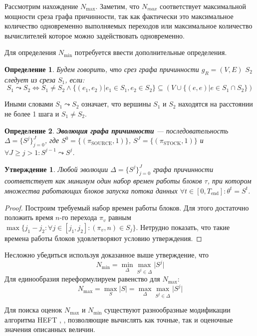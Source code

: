 \documentclass[10pt,a4paper]{article}
\newtheorem{defen}{Определение}
\newtheorem{theorem}{Утверждение}
\newcommand{\stock}{\text{STOCK}}
\newcommand{\source}{\text{SOURCE}}
\begin{document}
  Рассмотрим нахождение $N_{\max}$. Заметим, что $N_{max}$ соответствует максимальной мощности среза графа причинности, так как фактически это максимальное
  количество одновременно выполняемых переходов или максимальное количество вычислителей которое можно задействовать одновременно.
  
  Для определения $N_{\min}$ потребуется ввести дополнительные определения.
  \begin{defen}
    Будем говорить, что срез графа причинности $g_R = (V, E)$ $S_2$ следует из среза $S_1$, если:
    $$S_1 \leadsto S_2 \Leftrightarrow S_1 \neq S_2 \wedge \{(e_1, e_2) \vert e_1 \in S_1, e_2 \in S_2\} \subseteq (V \cup \{(e, e) \vert e \in S_1 \cap S_2\})$$
  \end{defen}
  Иными словами $S_1 \leadsto S_2$ означает, что вершины $S_1$ и $S_2$ находятся на расстоянии не более 1 шага и $S_1 \neq S_2$.
  
  \begin{defen}
    \textbf{Эволюция графа причинности} --- последовательность $\Delta = \{S^j\}^{J}_{j = 0}$, где $S^0 = \{(\pi_{\source}, 1)\}$,
    $S^J = \{(\pi_{\stock}, 1)\}$ и $\forall J \geq j > 1: S^{j - 1} \leadsto S^j$.
  \end{defen}
  
  \begin{theorem}
    Любой эволюции $\Delta = \{S^j\}^J_{j = 0}$ графа причинности соответствует как минимум один набор времен работы блоков $\tau$, при котором
    множества работающих блоков запуска потока данных $\forall t \in [0, T_{\text{end}}]: \theta^t = S^t$.
  \end{theorem}
  \begin{proof}
    Построим требуемый набор времен работы блоков. Для этого достаточно положить время $n$-го перехода $\pi_v$ равным
    $\max \{j_1 - j_2: \forall j \in [j_1, j_2]: (\pi_v, n) \in S_j\}$. Нетрудно показать, что такие времена работы блоков удовлетворяют условию утверждения.
  \end{proof}
  
  Несложно убедиться используя доказанное выше утверждение, что $$N_{\min} = \min_{\Delta} \max_{S^j \in \Delta} \lvert S^j \rvert$$
  Для единообразия переформулируем равенство для $N_{\max}$:
  $$N_{\max} = \max_{S} \lvert S \rvert = \max_{\Delta} \max_{S^j \in \Delta} \lvert S^j \rvert$$
  
  Для поиска оценок $N_{\max}$ и $N_{\min}$ существуют разнообразные модификации алгоритма HEFT \cite{heft}, \cite{yaheft},
  позволяющие вычислять как точные, так и оценочные значения описанных величин.
  
\end{document}
